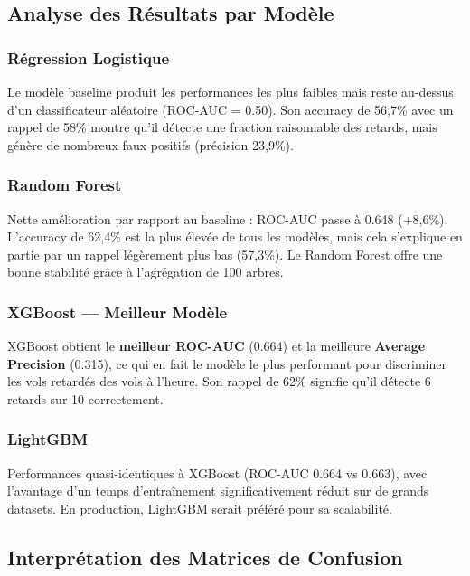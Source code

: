 \documentclass[12pt,a4paper]{article}
\begin{document}
\subsection{Analyse des Résultats par Modèle}

\subsubsection{Régression Logistique}

Le modèle baseline produit les performances les plus faibles mais reste au-dessus 
d'un classificateur aléatoire (ROC-AUC = 0.50). Son accuracy de 56,7\% avec 
un rappel de 58\% montre qu'il détecte une fraction raisonnable des retards,
mais génère de nombreux faux positifs (précision 23,9\%).

\subsubsection{Random Forest}

Nette amélioration par rapport au baseline : ROC-AUC passe à 0.648 (+8,6\%).
L'accuracy de 62,4\% est la plus élevée de tous les modèles, mais cela s'explique
en partie par un rappel légèrement plus bas (57,3\%). Le Random Forest offre une 
bonne stabilité grâce à l'agrégation de 100 arbres.

\subsubsection{XGBoost --- Meilleur Modèle}

\begin{resultbox}
  XGBoost obtient le \textbf{meilleur ROC-AUC} (0.664) et la meilleure 
  \textbf{Average Precision} (0.315), ce qui en fait le modèle le plus 
  performant pour discriminer les vols retardés des vols à l'heure. 
  Son rappel de 62\% signifie qu'il détecte 6 retards sur 10 correctement.
\end{resultbox}

\subsubsection{LightGBM}

Performances quasi-identiques à XGBoost (ROC-AUC 0.664 vs 0.663), avec l'avantage 
d'un temps d'entraînement significativement réduit sur de grands datasets. 
En production, LightGBM serait préféré pour sa scalabilité.

\subsection{Interprétation des Matrices de Confusion}
\end{document}
